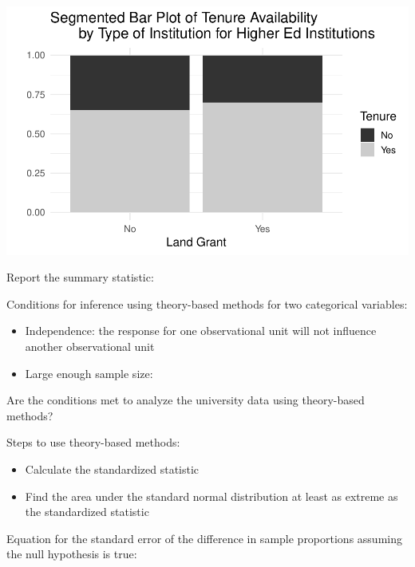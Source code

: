 \documentclass[
]{report}
\providecommand{\tightlist}{%
  \setlength{\itemsep}{0pt}\setlength{\parskip}{0pt}}
\begin{document}
\begin{center}\includegraphics[width=0.7\linewidth]{09-VN09-two-cat-theory_files/figure-latex/unnamed-chunk-1-1} \end{center}

Report the summary statistic:

\vspace{0.6in}

Conditions for inference using theory-based methods for two categorical variables:

\begin{itemize}
\tightlist
\item
  Independence: the response for one observational unit will not influence another observational unit
\end{itemize}

\vspace{0.2in}

\begin{itemize}
\tightlist
\item
  Large enough sample size:
\end{itemize}

\vspace{0.7in}

Are the conditions met to analyze the university data using theory-based methods?

\vspace{0.8in}

Steps to use theory-based methods:

\begin{itemize}
\item
  Calculate the standardized statistic
\item
  Find the area under the standard normal distribution at least as extreme as the standardized statistic
\end{itemize}

Equation for the standard error of the difference in sample proportions assuming the null hypothesis is true:
\end{document}
